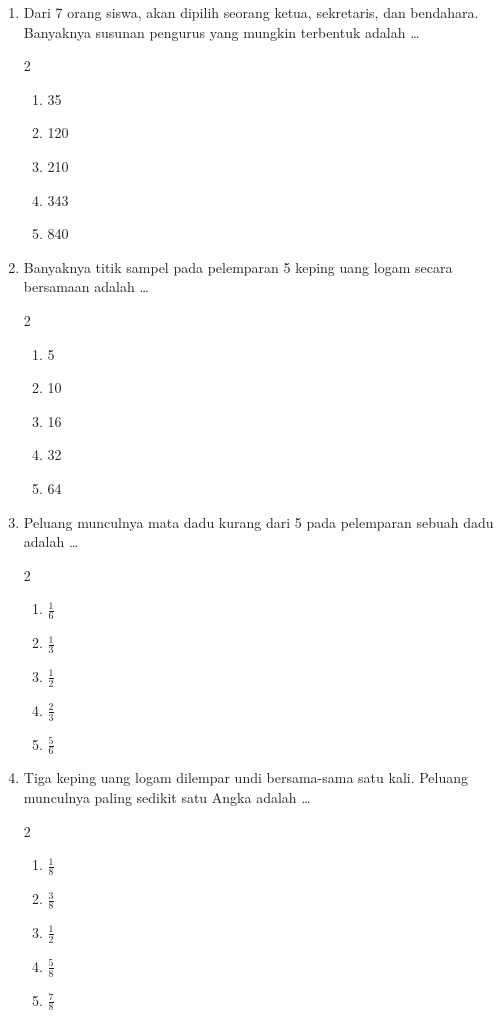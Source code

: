 \documentclass[12pt,a4paper]{article}
\begin{document}
\begin{enumerate}[itemsep=2ex]
    \item Dari 7 orang siswa, akan dipilih seorang ketua, sekretaris, dan bendahara. Banyaknya susunan pengurus yang mungkin terbentuk adalah \dots
    \begin{multicols}{2}
    \begin{enumerate}[label=\Alph*.]
        \item 35
        \item 120
        \item 210
        \item 343
        \item 840
    \end{enumerate}
    \end{multicols}

    \item Banyaknya titik sampel pada pelemparan 5 keping uang logam secara bersamaan adalah \dots
    \begin{multicols}{2}
    \begin{enumerate}[label=\Alph*.]
        \item 5
        \item 10
        \item 16
        \item 32
        \item 64
    \end{enumerate}
    \end{multicols}

    \item Peluang munculnya mata dadu kurang dari 5 pada pelemparan sebuah dadu adalah \dots
    \begin{multicols}{2}
    \begin{enumerate}[label=\Alph*.]
        \item $\frac{1}{6}$
        \item $\frac{1}{3}$
        \item $\frac{1}{2}$
        \item $\frac{2}{3}$
        \item $\frac{5}{6}$
    \end{enumerate}
    \end{multicols}

    \item Tiga keping uang logam dilempar undi bersama-sama satu kali. Peluang munculnya paling sedikit satu Angka adalah \dots
    \begin{multicols}{2}
    \begin{enumerate}[label=\Alph*.]
        \item $\frac{1}{8}$
        \item $\frac{3}{8}$
        \item $\frac{1}{2}$
        \item $\frac{5}{8}$
        \item $\frac{7}{8}$
    \end{enumerate}
    \end{multicols}


\end{enumerate}
\end{document}
